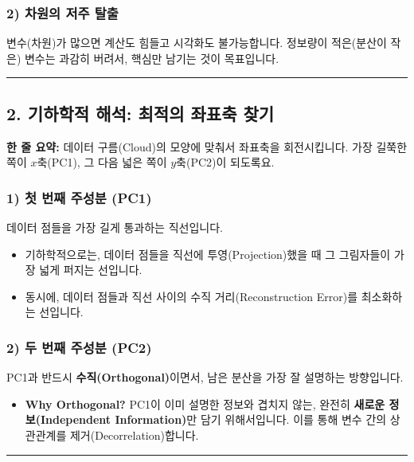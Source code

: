 \documentclass[11pt,a4paper]{book}
\theoremstyle{definition}
\begin{document}
\subsubsection*{2) 차원의 저주 탈출}
변수(차원)가 많으면 계산도 힘들고 시각화도 불가능합니다. 정보량이 적은(분산이 작은) 변수는 과감히 버려서, 핵심만 남기는 것이 목표입니다.

\vspace{0.5cm}\hrule\vspace{0.5cm}

\subsection{2. 기하학적 해석: 최적의 좌표축 찾기}


\begin{conceptbox}[title={개념 2: 럭비공 돌리기}]
\textbf{한 줄 요약:} 데이터 구름(Cloud)의 모양에 맞춰서 좌표축을 회전시킵니다. 가장 길쭉한 쪽이 $x$축(PC1), 그 다음 넓은 쪽이 $y$축(PC2)이 되도록요.
\end{conceptbox}

\subsubsection*{1) 첫 번째 주성분 (PC1)}
데이터 점들을 가장 길게 통과하는 직선입니다.
\begin{itemize}
    \item 기하학적으로는, 데이터 점들을 직선에 투영(Projection)했을 때 그 그림자들이 가장 넓게 퍼지는 선입니다.
    \item 동시에, 데이터 점들과 직선 사이의 수직 거리(Reconstruction Error)를 최소화하는 선입니다.
\end{itemize}

\subsubsection*{2) 두 번째 주성분 (PC2)}
PC1과 반드시 \textbf{수직(Orthogonal)}이면서, 남은 분산을 가장 잘 설명하는 방향입니다.
\begin{itemize}
    \item \textbf{Why Orthogonal?} PC1이 이미 설명한 정보와 겹치지 않는, 완전히 \textbf{새로운 정보(Independent Information)}만 담기 위해서입니다. 이를 통해 변수 간의 상관관계를 제거(Decorrelation)합니다.
\end{itemize}

\vspace{0.5cm}\hrule\vspace{0.5cm}
\end{document}
